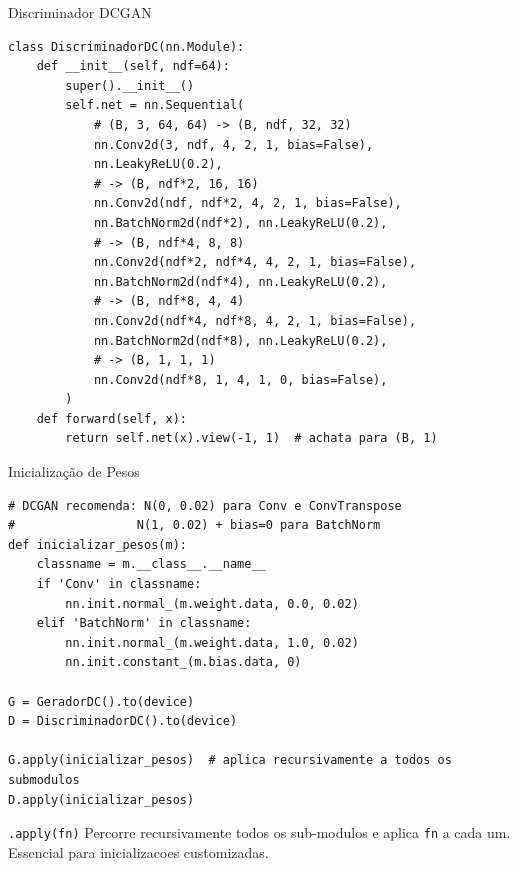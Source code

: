 \documentclass[aspectratio=169, 10pt]{beamer}
\begin{document}

\begin{frame}[fragile]{Discriminador DCGAN}
\begin{lstlisting}
class DiscriminadorDC(nn.Module):
    def __init__(self, ndf=64):
        super().__init__()
        self.net = nn.Sequential(
            # (B, 3, 64, 64) -> (B, ndf, 32, 32)
            nn.Conv2d(3, ndf, 4, 2, 1, bias=False),
            nn.LeakyReLU(0.2),
            # -> (B, ndf*2, 16, 16)
            nn.Conv2d(ndf, ndf*2, 4, 2, 1, bias=False),
            nn.BatchNorm2d(ndf*2), nn.LeakyReLU(0.2),
            # -> (B, ndf*4, 8, 8)
            nn.Conv2d(ndf*2, ndf*4, 4, 2, 1, bias=False),
            nn.BatchNorm2d(ndf*4), nn.LeakyReLU(0.2),
            # -> (B, ndf*8, 4, 4)
            nn.Conv2d(ndf*4, ndf*8, 4, 2, 1, bias=False),
            nn.BatchNorm2d(ndf*8), nn.LeakyReLU(0.2),
            # -> (B, 1, 1, 1)
            nn.Conv2d(ndf*8, 1, 4, 1, 0, bias=False),
        )
    def forward(self, x):
        return self.net(x).view(-1, 1)  # achata para (B, 1)
\end{lstlisting}
\end{frame}


\begin{frame}[fragile]{Inicialização de Pesos}
\begin{lstlisting}
# DCGAN recomenda: N(0, 0.02) para Conv e ConvTranspose
#                 N(1, 0.02) + bias=0 para BatchNorm
def inicializar_pesos(m):
    classname = m.__class__.__name__
    if 'Conv' in classname:
        nn.init.normal_(m.weight.data, 0.0, 0.02)
    elif 'BatchNorm' in classname:
        nn.init.normal_(m.weight.data, 1.0, 0.02)
        nn.init.constant_(m.bias.data, 0)

G = GeradorDC().to(device)
D = DiscriminadorDC().to(device)

G.apply(inicializar_pesos)  # aplica recursivamente a todos os submodulos
D.apply(inicializar_pesos)
\end{lstlisting}

\begin{block}{\texttt{.apply(fn)}}
  Percorre recursivamente todos os sub-modulos e aplica \texttt{fn} a cada um.
  Essencial para inicializacoes customizadas.
\end{block}
\end{frame}
\end{document}
